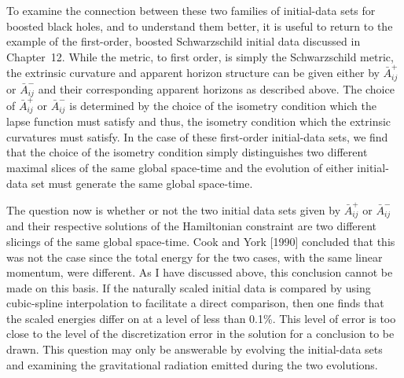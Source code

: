 To examine the connection between these two families of initial-data sets for
boosted black holes, and to understand them better, it is useful to return to
the example of the first-order, boosted Schwarzschild initial data discussed in
Chapter~12.  While the metric, to first order, is simply the Schwarzschild
metric, the extrinsic curvature and apparent horizon structure can be given
either by $\bar{A}^+_{ij}$ or $\bar{A}^-_{ij}$ and their corresponding apparent
horizons as described above.  The choice of $\bar{A}^+_{ij}$ or $\bar{A}^-_{ij}$
is determined by the choice of the isometry condition which the lapse function
must satisfy and thus, the isometry condition which the extrinsic curvatures
must satisfy.  In the case of these first-order initial-data sets, we find that
the choice of the isometry condition simply distinguishes two different maximal
slices of the same global space-time and the evolution of either initial-data
set must generate the same global space-time.

The question now is whether or not the two initial data sets given by
$\bar{A}^+_{ij}$ or $\bar{A}^-_{ij}$ and their respective solutions of the
Hamiltonian constraint are two different slicings of the same global
space-time.  Cook and York [1990] concluded that this was not the case since the
total energy for the two cases, with the same linear momentum, were different. 
As I have discussed above, this conclusion cannot be made on this basis.  If the
naturally scaled initial data is compared by using cubic-spline interpolation to
facilitate a direct comparison, then one finds that the scaled energies differ
on at a level of less than 0.1\%.  This level of error is too close to the
level of the discretization error in the solution for a conclusion to be drawn. 
This question may only be answerable by evolving the initial-data sets and
examining the gravitational radiation emitted during the two evolutions.

